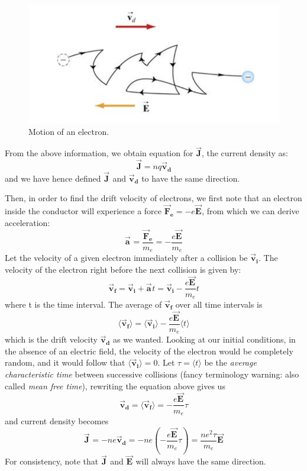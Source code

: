\documentclass[11pt, letterpaper]{article}
\newcommand{\bv}[2][]{\bm{\vec{#2}_{#1}}}
\begin{document}
\begin{figure}[h!]
	\centering
	\includegraphics[scale=0.5]{drift.png}
	\caption{Motion of an electron.}
	\label{fig:drift}
\end{figure} 
From the above information, we obtain equation for $\vec{\bm{J}}$, the current density as:
\begin{equation}\label{eqn:current-density}
	\boxed{\vec{\bm{J}} = nq\bm{\vec{v}_d}}
\end{equation} 
and we have hence defined $\bv{J}$ and $\bv[d]{v}$ to have the same direction. 
\pagebreak

Then, in order to find the drift velocity of electrons, we first note that an electron inside the conductor will experience a force $\bv[e]{F} = -e\bv{E}$, from which we can derive acceleration: \[\bv{a} = \frac{\bv[e]{F}}{m_e} = -\frac{e\bv{E}}{m_e}\] Let the velocity of a given electron immediately after a collision be $\bv[i]{v}$. The velocity of the electron right before the next collision is given by: \[\bv[f]{v} = \bv[i]{v} + \bv{a} t = \bv[i]{v} - \frac{e\bv{E}}{m_e} t\] where t is the time interval. The average of $\bv[f]{v}$ over all time intervals is \[\langle\bv[f]{v}\rangle = \langle\bv[i]{v}\rangle - \frac{e\bv{E}}{m_e}\langle t\rangle\] which is the drift velocity $\bv[d]{v}$ as we wanted. Looking at our initial conditions, in the absence of an electric field, the velocity of the electron would be completely random, and it would follow that $\langle\bv[i]{v}\rangle = 0$. Let $\tau = \langle t\rangle$ be the \textit{average characteristic time} between successive collisions (fancy terminology warning: also called \textit{mean free time}), rewriting the equation above gives us \[\bv[d]{v} = \langle\bv[f]{v}\rangle = -\frac{e\bv{E}}{m_e}\tau\] and current density becomes
\begin{equation}\label{eqn:curr-density}
	\boxed{\bv{J} = -ne\bv[d]{v} = -ne\left(-\frac{e\bv{E}}{m_e}\tau\right) = \frac{ne^2\tau}{m_e}\bv{E}}
\end{equation}
For consistency, note that $\bv{J}$ and $\bv{E}$ will always have the same direction.
\end{document}
